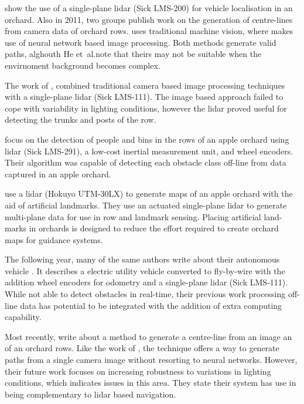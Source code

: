 \documentclass[preprint,authoryear,12pt]{elsarticle}
\begin{document}
        \cite{Hansen2011} show the use of a single-plane lidar (Sick LMS-200) for vehicle localisation in an orchard.
        Also in 2011, two groups publish work on the generation of centre-lines from camera data of orchard rows.
        \cite{He2011} uses traditional machine vision, where \cite{Torres2011} makes use of neural network based image processing.
        Both methods generate valid paths, alghouth He et~al.\@ note that theirs may not be suitable when the envirnoment background becomes complex.

        The work of \cite{Scarfe2012}, combined traditional camera based image processing techniques with a single-plane lidar (Sick LMS-111).
        The image based approach failed to cope with variability in lighting conditions, however the lidar proved useful for detecting the trunks and posts of the row.

        \cite{Freitas2012} focus on the detection of people and bins in the rows of an apple orchard using lidar (Sick LMS-291), a low-cost inertial measurement unit, and wheel encoders.
        Their algorithm was capable of detecting each obstacle class off-line from data captured in an apple orchard.

        \cite{Zhang2014} use a lidar (Hokuyo UTM-30LX) to generate maps of an apple orchard with the aid of artificial landmarks.
        They use an actuated single-plane lidar to generate multi-plane data for use in row and landmark sensing.
        Placing artificial land-marks in orchards is designed to reduce the effort required to create orchard maps for guidance systems.

        The following year, many of the same authors write about their autonomous vehicle \citep{Bergerman2015}.
        It describes a electric utility vehicle converted to fly-by-wire with the addition wheel encoders for odometry and a single-plane lidar (Sick LMS-111).
        While not able to detect obstacles in real-time, their previous work processing off-line data \citep{Freitas2012} has potential to be integrated with the addition of extra computing capability.

        Most recently, \cite{Sharifi2015} write about a method to generate a centre-line from an image an of an orchard rows.
        Like the work of \cite{He2011}, the technique offers a way to generate paths from a single camera image without resorting to neural networks.
        However, their future work focuses on increasing robustness to variations in lighting conditions, which indicates issues in this area.
        They state their system has use in being complementary to lidar based navigation.
\end{document}
